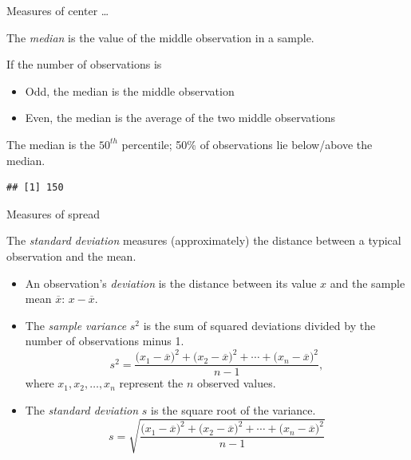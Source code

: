 \documentclass[
  ignorenonframetext,
]{beamer}
\newenvironment{Shaded}{\begin{snugshade}}{\end{snugshade}}
\newcommand{\KeywordTok}[1]{\textcolor[rgb]{0.13,0.29,0.53}{\textbf{#1}}}
\newcommand{\NormalTok}[1]{#1}
\newcommand{\OperatorTok}[1]{\textcolor[rgb]{0.81,0.36,0.00}{\textbf{#1}}}
\providecommand{\tightlist}{%
  \setlength{\itemsep}{0pt}\setlength{\parskip}{0pt}}
\begin{document}
\begin{frame}[fragile]{Measures of center \ldots{}}
\protect\hypertarget{measures-of-center-1}{}

The \emph{median} is the value of the middle observation in a sample.

If the number of observations is

\begin{itemize}
\tightlist
\item
  Odd, the median is the middle observation
\item
  Even, the median is the average of the two middle observations
\end{itemize}

The median is the \(50^{th}\) percentile; 50\% of observations lie
below/above the median.

\scriptsize

\begin{Shaded}
\end{Shaded}

\begin{verbatim}
## [1] 150
\end{verbatim}

\normalsize

\end{frame}

\begin{frame}{Measures of spread}
\protect\hypertarget{measures-of-spread}{}

The \emph{standard deviation} measures (approximately) the distance
between a typical observation and the mean.

\begin{itemize}
\item
  An observation's \emph{deviation} is the distance between its value
  \(x\) and the sample mean \(\overline{x}\): \(x - \overline{x}\).
\item
  The \emph{sample variance} \(s^2\) is the sum of squared deviations
  divided by the number of observations minus 1.
  \[s^2 = \frac{({x_1 - \overline{x})}^{2}+({x_2 - \overline{x})}^{2}+\cdots+({x_n - \overline{x})}^{2}}{n-1}, \]
  where \(x_1, x_2, \dots, x_n\) represent the \(n\) observed values.
\item
  The \emph{standard deviation} \(s\) is the square root of the
  variance.
  \[s = \sqrt{\frac{({x_1 - \overline{x})}^{2}+({x_2 - \overline{x})}^{2}+\cdots+({x_n - \overline{x})}^{2}}{n-1}}\]
\end{itemize}

\end{frame}
\end{document}
